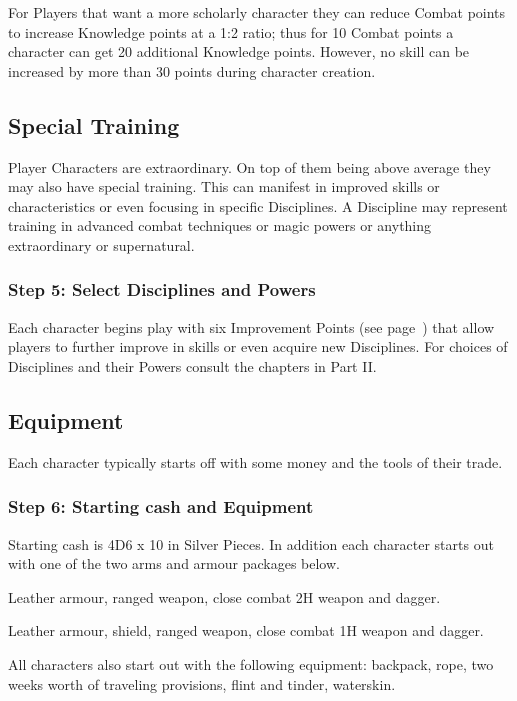 For Players that want a more scholarly character they can reduce Combat points to increase Knowledge points at a 1:2 ratio; thus for 10 Combat points a character can get 20 additional Knowledge points. However, no skill can be increased by more than 30 points during character creation.


\subsection{Special Training}
Player Characters are extraordinary. On top of them being above average they may also have special training. This can manifest in improved skills or characteristics or even focusing in specific Disciplines. A Discipline may represent training in advanced combat techniques or magic powers or anything extraordinary or supernatural.


\subsubsection{Step 5: Select Disciplines and Powers}
Each character begins play with six Improvement Points (see page~\pageref{ssec:improvement-points}) that allow players to further improve in skills or even acquire new Disciplines. For choices of Disciplines and their Powers consult the chapters in Part II.

\subsection{Equipment}
Each character typically starts off with some money and the tools of their trade.

\subsubsection{Step 6: Starting cash and Equipment}
Starting cash is 4D6 x 10 in Silver Pieces. In addition each character starts out with one of the two arms and armour packages below.

\begin{rpg-list}
	\item Leather armour, ranged weapon, close combat 2H weapon and dagger. 
	\item Leather armour, shield, ranged weapon, close combat 1H weapon and dagger.
\end{rpg-list}

All characters also start out with the following equipment: backpack, rope, two weeks worth of traveling provisions, flint and tinder, waterskin.

